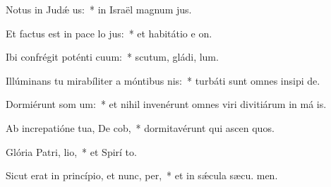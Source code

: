 \item Notus in Judǽ us:~* in Israël magnum  jus.
\item Et factus est in pace lo jus:~* et habitátio e  on.
\item Ibi confrégit poténti cuum:~* scutum, gládi,  lum.
\item Illúminans tu mirabíliter a móntibus nis:~* turbáti sunt omnes insipi de.
\item Dormiérunt som um:~* et nihil invenérunt omnes viri divitiárum in má is.
\item Ab increpatióne tua, De cob,~* dormitavérunt qui ascen quos.
\item Glória Patri,  lio,~* et Spirí to.
\item Sicut erat in princípio, et nunc,  per,~* et in sǽcula sæcu. men.
